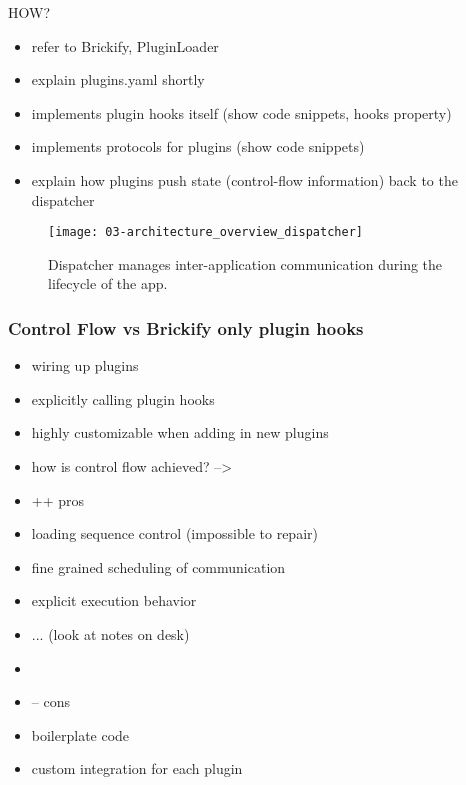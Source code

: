 \documentclass[../ClassicThesis.tex]{subfiles}
\begin{document}
HOW?

\begin{itemize}
\item refer to Brickify, PluginLoader
\item explain plugins.yaml shortly
\item implements plugin hooks itself (show code snippets, hooks property)

\item implements protocols for plugins (show code snippets)
\item explain how plugins push state (control-flow information) back to the
  dispatcher
\end{itemize}

\begin{figure}
  \centering
  \texttt{[image: 03-architecture\_overview\_dispatcher]}
  \caption{Dispatcher manages inter-application communication during the
    lifecycle of the app.}
  \label{fig:architecture_overview_dispatcher}
\end{figure}


\subsubsection{Control Flow vs Brickify only plugin hooks}

\begin{itemize}
\item wiring up plugins
\item explicitly calling plugin hooks
\item highly customizable when adding in new plugins
\item how is control flow achieved? -->
\end{itemize}

\begin{itemize}
\item ++ pros
\item loading sequence control (impossible to repair)
\item fine grained scheduling of communication
\item explicit execution behavior
\item ... (look at notes on desk)
\item
\item -- cons
\item boilerplate code
\item custom integration for each plugin
\end{itemize}
\end{document}
